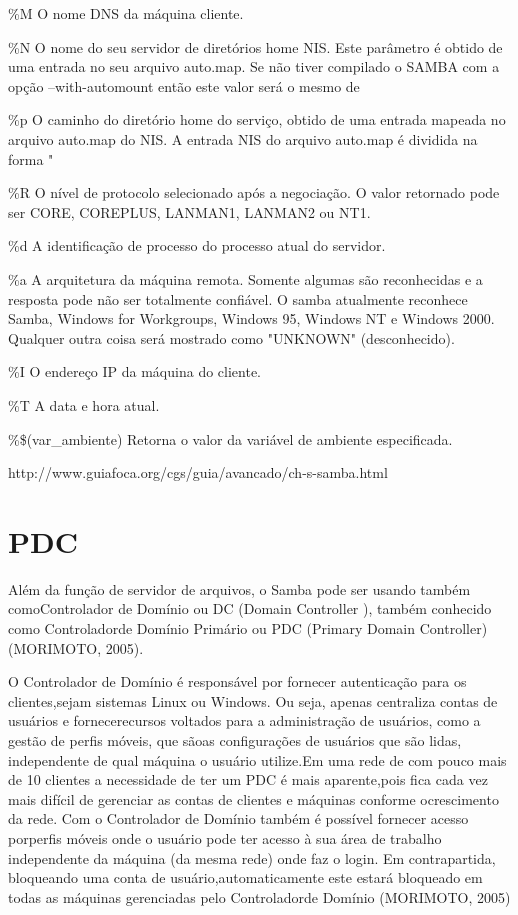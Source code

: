 \%M
O nome DNS da máquina cliente.

\%N
O nome do seu servidor de diretórios home NIS. Este parâmetro é obtido de uma entrada no seu arquivo auto.map. Se não tiver compilado o SAMBA com a opção --with-automount então este valor será o mesmo de %

\%p
O caminho do diretório home do serviço, obtido de uma entrada mapeada no arquivo auto.map do NIS. A entrada NIS do arquivo auto.map é dividida na forma "%

\%R
O nível de protocolo selecionado após a negociação. O valor retornado pode ser CORE, COREPLUS, LANMAN1, LANMAN2 ou NT1.

\%d
A identificação de processo do processo atual do servidor.

\%a
A arquitetura da máquina remota. Somente algumas são reconhecidas e a resposta pode não ser totalmente confiável. O samba atualmente reconhece Samba, Windows for Workgroups, Windows 95, Windows NT e Windows 2000. Qualquer outra coisa será mostrado como "UNKNOWN" (desconhecido).

\%I
O endereço IP da máquina do cliente.

\%T
A data e hora atual.

\%\$(var\_ambiente)
Retorna o valor da variável de ambiente especificada.

http://www.guiafoca.org/cgs/guia/avancado/ch-s-samba.html

\section{PDC}

Além da função de servidor de arquivos, o Samba pode ser usando também comoControlador de Domínio ou DC (Domain Controller 
), também conhecido como Controladorde Domínio Primário ou PDC (Primary Domain Controller) (MORIMOTO, 2005).

O Controlador de Domínio é responsável por fornecer autenticação para os clientes,sejam sistemas Linux ou Windows. Ou seja, apenas centraliza contas de usuários e fornecerecursos voltados para a administração de usuários, como a gestão de perfis móveis, que sãoas configurações de usuários que são lidas, independente de qual máquina o usuário utilize.Em uma rede de com pouco mais de 10 clientes a necessidade de ter um PDC é mais aparente,pois fica cada vez mais difícil de gerenciar as contas de clientes e máquinas conforme ocrescimento da rede. Com o Controlador de Domínio também é possível fornecer acesso porperfis móveis onde o usuário pode ter acesso à sua área de trabalho independente da máquina (da mesma rede) onde faz o login. Em contrapartida, bloqueando uma conta de usuário,automaticamente este estará bloqueado em todas as máquinas gerenciadas pelo Controladorde Domínio (MORIMOTO, 2005)

